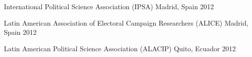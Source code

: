 \begin{cvhonors}
\cvconf
{International Political Science Association (IPSA)} 
{Madrid, Spain}
{2012}
\end{cvhonors}

\begin{cvhonors}
\cvconf
{Latin American Association of Electoral Campaign Researchers (ALICE)} 
{Madrid, Spain}
{2012}
\end{cvhonors}

\begin{cvhonors}
\cvconf
{Latin American Political Science Association (ALACIP)} 
{Quito, Ecuador}
{2012}
\end{cvhonors}

\vspace{1mm}